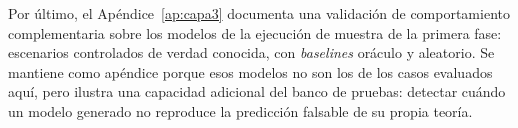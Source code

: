 Por último, el Apéndice~\ref{ap:capa3} documenta una validación de
comportamiento complementaria sobre los modelos de la ejecución de muestra de la
primera fase: escenarios controlados de verdad conocida, con \textit{baselines}
oráculo y aleatorio. Se mantiene como apéndice porque esos modelos no son los de
los casos evaluados aquí, pero ilustra una capacidad adicional del banco de
pruebas: detectar cuándo un modelo generado no reproduce la predicción falsable
de su propia teoría.
